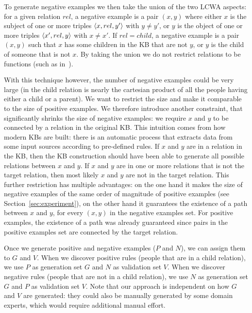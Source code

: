 To generate negative examples we then take the union of the two LCWA aspects: for a given relation $rel$, a negative example is a pair $(x,y)$ where either $x$ is the subject of one or more triples $\langle x,rel,y'\rangle$ with $y \neq y'$, or $y$ is the object of one or more triples $\langle x',rel,y\rangle$ with $x \neq x'$. If $rel=child$, a negative example is a pair $(x,y)$ such that $x$ has some children in the KB that are not $y$, or $y$ is the child of someone that is not $x$. By taking the union we do not restrict relations to be functions (such as in~\cite{galarraga2015fast}). 

With this technique however, the number of negative examples could be very large (in the child relation is nearly the cartesian product of all the people having either a child or a parent). We want to restrict the size and make it comparable to the size of positive examples.  We therefore introduce another constraint, that significantly shrinks the size of negative examples: we require $x$ and $y$ to be connected by a relation in the original KB. This intuition comes from how modern KBs are built: there is an automatic process that extracts data from some input sources according to pre-defined rules. If $x$ and $y$ are in a relation in the KB, then the KB construction should have been able to generate all possible relations between $x$ and $y$. If $x$ and $y$ are in one or more relations that is not the target relation, then most likely $x$ and $y$ are not in the target relation. This further restriction has multiple advantages: on the one hand it makes the size of negative examples of the same order of magnitude of positive examples (see Section~\ref{sec:experiment}), on the other hand it guarantees the existence of a path between $x$ and $y$, for every $(x,y)$ in the negative examples set. For positive examples, the existence of a path was already guaranteed since pairs in the positive examples set are connected by the target relation.

Once we generate positive and negative examples ($P$ and $N$), we can assign them to $G$ and $V$. When we discover positive rules (people that are in a child relation), we use $P$ as generation set $G$ and $N$ as validation set $V$. When we discover negative rules (people that are not in a child relation), we use $N$ as generation set $G$ and $P$ as validation set $V$. Note that our approach is independent on how $G$ and $V$ are generated: they could also be manually generated by some domain experts, which would require additional manual effort.


